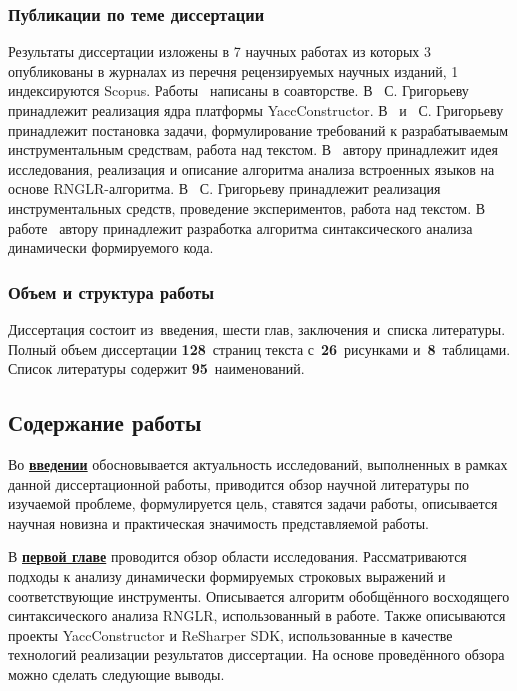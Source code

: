 \subsubsection*{\large{Публикации по теме диссертации}}

Результаты диссертации изложены в 7 научных работах из которых 3~\cite{1,2,3} опубликованы в журналах из перечня рецензируемых научных изданий, 1~\cite{4} индексируются Scopus. Работы~\cite{1, 2, 3, 4, 5, 6, 7} написаны в соавторстве. В~\cite{1} С. Григорьеву принадлежит реализация ядра платформы YaccConstructor. В~\cite{2, 3} и~\cite{5} С. Григорьеву принадлежит постановка задачи, формулирование требований к разрабатываемым инструментальным средствам, работа над текстом. В~\cite{4} автору принадлежит идея исследования, реализация и описание алгоритма анализа встроенных языков на основе RNGLR-алгоритма.  В~\cite{6} С. Григорьеву принадлежит реализация инструментальных средств, проведение экспериментов, работа над текстом. В работе~\cite{7} автору принадлежит разработка алгоритма синтаксического анализа динамически формируемого кода.


\subsubsection*{\large{Объем и структура работы}}
Диссертация состоит из~введения, шести глав, заключения и~списка литературы. Полный объем диссертации \textbf{128}~страниц текста с~\textbf{26}~рисунками и~\textbf{8}~таблицами. Список литературы содержит \textbf{95}~наименований.

\subsection*{\Large Содержание работы}
Во \underline{\textbf{введении}} обосновывается актуальность исследований, выполненных в рамках данной диссертационной работы, приводится обзор научной литературы по изучаемой проблеме, формулируется цель, 
ставятся задачи работы, описывается научная новизна и практическая значимость представляемой работы.


В \underline{\textbf{первой главе}} проводится обзор области исследования. Рассматриваются подходы к анализу динамически формируемых строковых выражений и соответствующие инструменты. Описывается алгоритм обобщённого восходящего синтаксического анализа RNGLR, использованный в работе. Также описываются 
проекты YaccConstructor и ReSharper SDK, использованные в качестве технологий реализации результатов диссертации. На основе проведённого обзора можно сделать следующие выводы.

